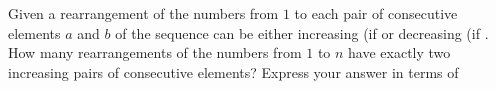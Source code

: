Given a rearrangement of the numbers from $1$ to  each pair of consecutive elements $a$ and $b$ of the sequence can be either increasing (if  or decreasing (if . How many rearrangements of the numbers from $1$ to $n$ have exactly two increasing pairs of consecutive elements? Express your answer in terms of 